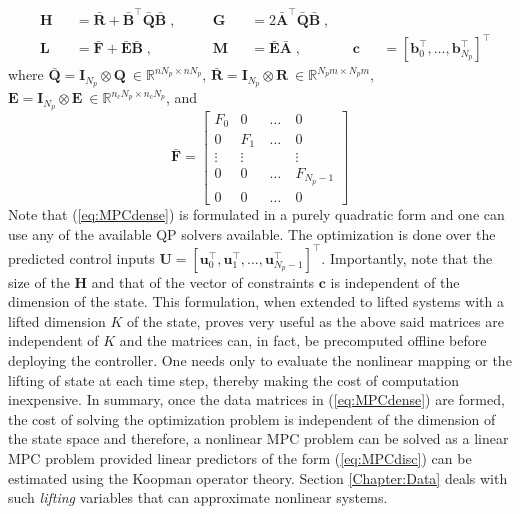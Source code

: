 \begin{equation}
    \begin{alignedat}{5}
    &\mathbf{H} && = \mathbf{\bar{R}} + \mathbf{\bar{B}}^\top\mathbf{\bar{Q}}\mathbf{\bar{B}} \;, \quad &&\mathbf{G} && = 2\mathbf{\bar{A}}^\top\mathbf{\bar{Q}}\mathbf{\bar{B}}\;, && \\
    & \mathbf{L} &&= \mathbf{\bar{F}} + \mathbf{\bar{E}\bar{B}}\;, && \mathbf{M} && = \mathbf{\bar{E}\bar{A}} \;,&& \mathbf{c} &&= [\mathbf{b}_0^\top,\dots,\mathbf{b}_{N_p}^\top]^\top
    \end{alignedat}
\end{equation}
where $\mathbf{\bar{Q}} = \mathbf{I}_{N_p} \otimes \mathbf{Q}  ~\in \mathbb{R}^{nN_p \times nN_p}$, $\mathbf{\bar{R}} = \mathbf{I}_{N_p} \otimes \mathbf{R} ~ \in \mathbb{R}^{N_pm \times N_pm}$, $\mathbf{E} = \mathbf{I}_{N_p} \otimes \mathbf{E}  ~\in \mathbb{R}^{n_cN_p \times n_cN_p}$, and
\begin{equation*}
    \mathbf{\bar{F}} = \begin{bmatrix}
    F_0 & 0 & ~ \dots ~ & 0 \\
    0 & F_1 & ~ \dots ~ & 0 \\
    \vdots & \vdots & & \vdots\\
    0 & 0 & ~ \dots ~ & F_{N_p-1}\\
    0 & 0 & ~ \dots ~ & 0
    \end{bmatrix}
\end{equation*}
Note that (\ref{eq:MPCdense}) is formulated in a purely quadratic form and one can use any of the available QP solvers available. The optimization is done over the predicted control inputs $\mathbf{U} = [\mathbf{u}_0^\top,\mathbf{u}_1^\top,\dots,\mathbf{u}_{N_p-1}^\top]^\top$. Importantly, note that the size of the $\mathbf{H}$ and that of the vector of constraints $\mathbf{c}$ is independent of the dimension of the state. This formulation, when extended to lifted systems with a lifted dimension $K$ of the state, proves very useful as the above said matrices are independent of $K$ and the matrices can, in fact, be precomputed offline before deploying the controller. One needs only to evaluate the nonlinear mapping or the lifting of state at each time step, thereby making the cost of computation inexpensive. In summary, once the data matrices in (\ref{eq:MPCdense}) are formed, the cost of solving the optimization problem is independent of the dimension of the state space and therefore, a nonlinear MPC problem can be solved as a linear MPC problem provided linear predictors of the form (\ref{eq:MPCdisc}) can be estimated using the Koopman operator theory. Section \ref{Chapter:Data} deals with such \textit{lifting} variables that can approximate nonlinear systems.
